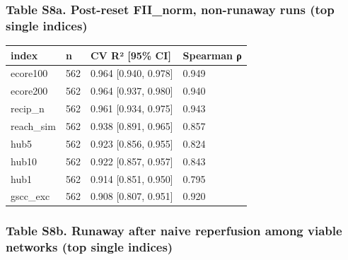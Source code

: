 \documentclass[11pt]{article}
\newcounter{none}
\begin{document}
\subsubsection{Table S8a. Post-reset FII\_norm, non-runaway runs (top single indices)}\label{table-s8a.-post-reset-fii_norm-non-runaway-runs-top-single-indices}

{\def\LTcaptype{none} %
\begin{longtable}[]{@{}llll@{}}
\toprule\noalign{}
index & n & CV R² {[}95\% CI{]} & Spearman ρ \\
\midrule\noalign{}
\endhead
\bottomrule\noalign{}
\endlastfoot
ecore100 & 562 & 0.964 {[}0.940, 0.978{]} & 0.949 \\
ecore200 & 562 & 0.964 {[}0.937, 0.980{]} & 0.940 \\
recip\_n & 562 & 0.961 {[}0.934, 0.975{]} & 0.943 \\
reach\_sim & 562 & 0.938 {[}0.891, 0.965{]} & 0.857 \\
hub5 & 562 & 0.923 {[}0.856, 0.955{]} & 0.824 \\
hub10 & 562 & 0.922 {[}0.857, 0.957{]} & 0.843 \\
hub1 & 562 & 0.914 {[}0.851, 0.950{]} & 0.795 \\
gscc\_exc & 562 & 0.908 {[}0.807, 0.951{]} & 0.920 \\
\end{longtable}
}

\subsubsection{Table S8b. Runaway after naive reperfusion among viable networks (top single indices)}\label{table-s8b.-runaway-after-naive-reperfusion-among-viable-networks-top-single-indices}
\end{document}
